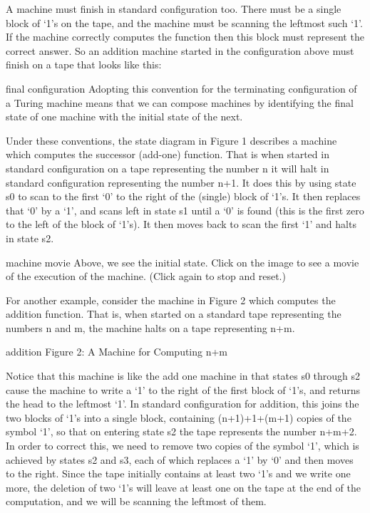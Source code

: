 A machine must finish in standard configuration too. There must be a single block of ‘1’s on the tape, and the machine must be scanning the leftmost such ‘1’. If the machine correctly computes the function then this block must represent the correct answer. So an addition machine started in the configuration above must finish on a tape that looks like this:

final configuration
Adopting this convention for the terminating configuration of a Turing machine means that we can compose machines by identifying the final state of one machine with the initial state of the next.

Under these conventions, the state diagram in Figure 1 describes a machine which computes the successor (add-one) function. That is when started in standard configuration on a tape representing the number n it will halt in standard configuration representing the number n+1. It does this by using state s0 to scan to the first ‘0’ to the right of the (single) block of ‘1’s. It then replaces that ‘0’ by a ‘1’, and scans left in state s1 until a ‘0’ is found (this is the first zero to the left of the block of ‘1’s). It then moves back to scan the first ‘1’ and halts in state s2.

machine movie
Above, we see the initial state. Click on the image to see a movie of the execution of the machine. (Click again to stop and reset.)

For another example, consider the machine in Figure 2 which computes the addition function. That is, when started on a standard tape representing the numbers n and m, the machine halts on a tape representing n+m.

addition
Figure 2: A Machine for Computing n+m

Notice that this machine is like the add one machine in that states s0 through s2 cause the machine to write a ‘1’ to the right of the first block of ‘1’s, and returns the head to the leftmost ‘1’. In standard configuration for addition, this joins the two blocks of ‘1’s into a single block, containing (n+1)+1+(m+1) copies of the symbol ‘1’, so that on entering state s2 the tape represents the number n+m+2. In order to correct this, we need to remove two copies of the symbol ‘1’, which is achieved by states s2 and s3, each of which replaces a ‘1’ by ‘0’ and then moves to the right.
Since the tape initially contains at least two ‘1’s and we write one more, the deletion of two ‘1’s will leave at least one on the tape at the end of the computation, and we will be scanning the leftmost of them.

